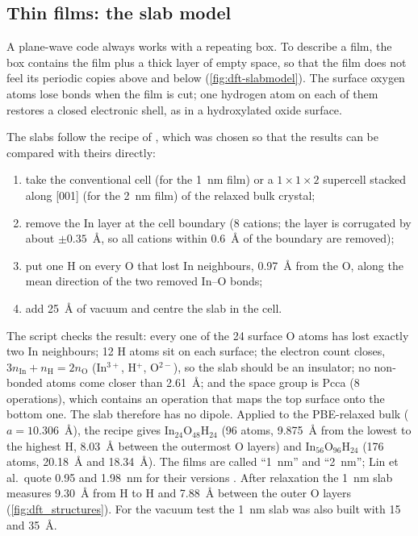 \subsection{Thin films: the slab model}
\label{sec:dft-slabstruct}

\begin{dftplain}
A plane-wave code always works with a repeating box. To describe a film, the box contains the film plus a thick layer of
empty space, so that the film does not feel its periodic copies above and below (\cref{fig:dft-slabmodel}). The
surface oxygen atoms lose bonds when the film is cut; one hydrogen atom on each of them restores a closed electronic
shell, as in a hydroxylated oxide surface.
\end{dftplain}

The slabs follow the recipe of \citet[p.~21542]{Lin2022}, which was chosen so that the results can be compared with
theirs directly:
\begin{enumerate}
\item take the conventional cell (for the 1~nm film) or a $1\times1\times2$ supercell stacked along [001] (for the 2~nm
film) of the relaxed bulk crystal;
\item remove the In layer at the cell boundary (8 cations; the layer is corrugated by about $\pm0.35$~\AA, so all
cations within 0.6~\AA{} of the boundary are removed);
\item put one H on every O that lost In neighbours, 0.97~\AA{} from the O, along the mean direction of the two removed
In--O bonds;
\item add 25~\AA{} of vacuum and centre the slab in the cell.
\end{enumerate}
The script checks the result: every one of the 24 surface O atoms has lost exactly two In neighbours; 12 H atoms sit on
each surface; the electron count closes, $3n_{\mathrm{In}} + n_{\mathrm{H}} = 2n_{\mathrm{O}}$ (In$^{3+}$, H$^+$,
O$^{2-}$), so the slab should be an insulator; no non-bonded atoms come closer than 2.61~\AA; and the space group is
Pcca (8 operations), which contains an operation that maps the top surface onto the bottom one. The slab therefore has no
dipole. Applied to the PBE-relaxed bulk ($a = 10.306$~\AA), the recipe gives In$_{24}$O$_{48}$H$_{24}$ (96 atoms,
9.875~\AA{} from the lowest to the highest H, 8.03~\AA{} between the outermost O layers) and In$_{56}$O$_{96}$H$_{24}$
(176 atoms, 20.18~\AA{} and 18.34~\AA). The films are called ``1~nm'' and ``2~nm''; Lin et al.\ quote 0.95 and 1.98~nm
for their versions \citep[p.~21540]{Lin2022}. After relaxation the 1~nm slab measures 9.30~\AA{} from H to H and
7.88~\AA{} between the outer O layers (\cref{fig:dft_structures}). For the vacuum test the 1~nm slab was also built with
15 and 35~\AA.


